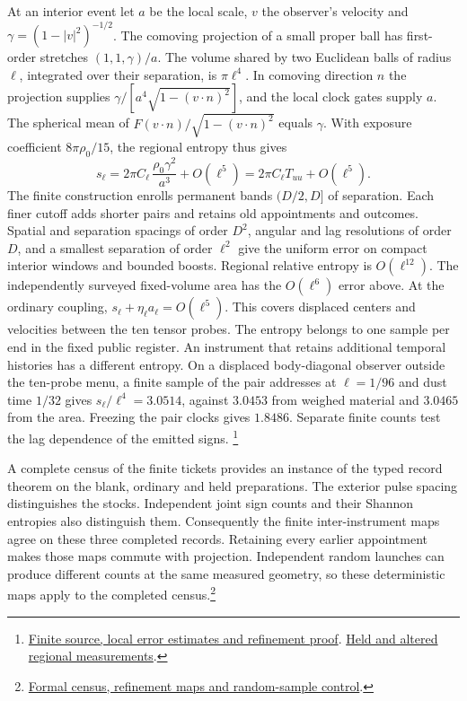 \documentclass[11pt]{article}
\begin{document}
At an interior event let $a$ be the local scale, $v$ the observer's
velocity and $\gamma=(1-|v|^2)^{-1/2}$. The comoving projection of
a small proper ball has first-order stretches $(1,1,\gamma)/a$. The
volume shared by two Euclidean balls of radius $\ell$, integrated
over their separation, is $\pi\ell^4$. In comoving direction $n$
the projection supplies $\gamma/[a^4\sqrt{1-(v\cdot n)^2}]$, and
the local clock gates supply $a$. The spherical mean of
$F(v\cdot n)/\sqrt{1-(v\cdot n)^2}$ equals $\gamma$. With exposure
coefficient $8\pi\rho_0/15$, the regional entropy thus gives
\[
 s_\ell=2\pi C_\ell\,\frac{\rho_0\gamma^2}{a^3}+O(\ell^5)
       =2\pi C_\ell T_{uu}+O(\ell^5).
\]
The finite construction enrolls permanent bands $(D/2,D]$ of
separation. Each finer cutoff adds shorter pairs and retains old
appointments and outcomes. Spatial and separation spacings of order
$D^2$, angular and lag resolutions of order $D$, and a smallest
separation of order $\ell^2$ give the uniform error on compact
interior windows and bounded boosts. Regional relative entropy is
$O(\ell^{12})$. The independently surveyed fixed-volume area has the
$O(\ell^6)$ error above. At the ordinary coupling,
$s_\ell+\eta_\ell a_\ell=O(\ell^5)$. This covers displaced centers
and velocities between the ten tensor probes. The entropy belongs to
one sample per end in the fixed public register. An instrument that
retains additional temporal histories has a different entropy.
On a displaced body-diagonal observer outside the ten-probe menu, a
finite sample of the pair addresses at $\ell=1/96$ and dust time $1/32$
gives $s_\ell/\ell^4=3.0514$, against $3.0453$ from weighed material
and $3.0465$ from the area. Freezing the pair clocks gives $1.8486$.
Separate finite counts test the lag dependence of the emitted signs.
\footnote{\href{https://github.com/FloatingPragma/observer-patch-holography/blob/main/model/candidate_laws/interval_echo_published_records/spherical_dust/clock_pairs/REFINEMENT.md}{Finite source, local error estimates and refinement proof}.
\href{https://github.com/FloatingPragma/observer-patch-holography/blob/main/model/candidate_laws/interval_echo_published_records/spherical_dust/clock_pairs/regions.json}{Held and altered regional measurements}.}

A complete census of the finite tickets provides an instance of the
typed record theorem on the blank, ordinary and held preparations.
The exterior pulse spacing distinguishes the stocks. Independent
joint sign counts and their Shannon entropies also distinguish them.
Consequently the finite inter-instrument maps agree on these three
completed records. Retaining every earlier appointment makes those
maps commute with projection. Independent random launches can
produce different counts at the same measured geometry, so these
deterministic maps apply to the completed census.\footnote{\href{https://github.com/FloatingPragma/observer-patch-holography/blob/main/Lean/ObserverPatchHolography/EinsteinBranch/ClockPairRecords.lean}{Formal census, refinement maps and random-sample control}.}
\end{document}
